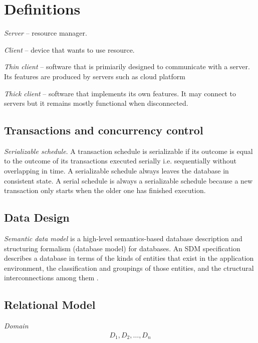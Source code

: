 \section{Definitions}

{\it Server} -- resource manager.

{\it Client} -- device that wants to use resource.

{\it Thin client} -- software that is primiarily designed to
communicate with a server. Its features are produced by servers such as cloud
platform

{\it Thick client} -- software that implements its own
features. It may connect to servers but it remains mostly functional when
disconnected.

\subsection{Transactions and concurrency control}

{\it Serializable schedule}. A transaction schedule
is serializable if its outcome is equal to the outcome of its transactions
executed serially i.e. sequentially without overlapping in time. A serializable
schedule always leaves the database in consistent state. A serial schedule is
always a serializable schedule because a new transaction only starts when the
older one has finished execution. 

\subsection{Data Design}

{\it Semantic data model} is a high-level
semantics-based database description and structuring formalism (database
model) for databases. An SDM specification describes a database in terms of
the kinds of entities that exist in the application environment, the
classification and groupings of those entities, and the ctructural
interconnections among them \cite{semantic-data-model}.

\subsection{Relational Model}


{\it Domain}
\begin{eqnarray*}
    D_{1}, D_{2},\ldots,D_{n}
\end{eqnarray*}


